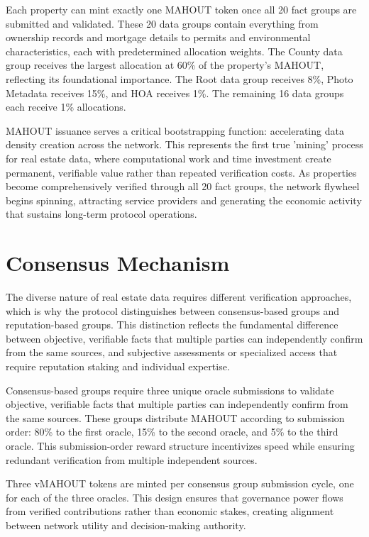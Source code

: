 Each property can mint exactly one MAHOUT token once all 20 fact groups are submitted and validated. These 20 data groups contain everything from ownership records and mortgage details to permits and environmental characteristics, each with predetermined allocation weights. The County data group receives the largest allocation at 60\% of the property's MAHOUT, reflecting its foundational importance. The Root data group receives 8\%, Photo Metadata receives 15\%, and HOA receives 1\%. The remaining 16 data groups each receive 1\% allocations.

MAHOUT issuance serves a critical bootstrapping function: accelerating data density creation across the network. This represents the first true 'mining' process for real estate data, where computational work and time investment create permanent, verifiable value rather than repeated verification costs. As properties become comprehensively verified through all 20 fact groups, the network flywheel begins spinning, attracting service providers and generating the economic activity that sustains long-term protocol operations.

\section{Consensus Mechanism}

The diverse nature of real estate data requires different verification approaches, which is why the protocol distinguishes between consensus-based groups and reputation-based groups. This distinction reflects the fundamental difference between objective, verifiable facts that multiple parties can independently confirm from the same sources, and subjective assessments or specialized access that require reputation staking and individual expertise.

Consensus-based groups require three unique oracle submissions to validate objective, verifiable facts that multiple parties can independently confirm from the same sources. These groups distribute MAHOUT according to submission order: 80\% to the first oracle, 15\% to the second oracle, and 5\% to the third oracle. This submission-order reward structure incentivizes speed while ensuring redundant verification from multiple independent sources.

Three vMAHOUT tokens are minted per consensus group submission cycle, one for each of the three oracles. This design ensures that governance power flows from verified contributions rather than economic stakes, creating alignment between network utility and decision-making authority.

